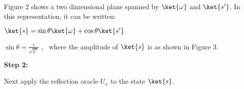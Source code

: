 \documentclass{article}
\begin{document}
\begin{tikzpicture}[x=0.75pt,y=0.75pt,yscale=-1,xscale=1]
\end{tikzpicture}

Figure 2 shows a two dimensional plane spanned by $\ket{\omega}$ and $\ket{s'}$. In this representation, it can be written:
\vspace{5mm}

\qquad $\ket{s} = \sin\theta\ket{\omega} + \cos\theta\ket{s'}$
\vspace{5mm}

\qquad $\sin\theta = \frac{1}{\sqrt{2^n}}$ , \ where the amplitude of $\ket{s}$ is as shown in Figure 3.
\vspace{5mm}

\textbf{Step 2:}
\vspace{5mm}

Next apply the reflection oracle $U_\omega$ to the state $\ket{s}$.
\vspace{5mm}



\end{document}
